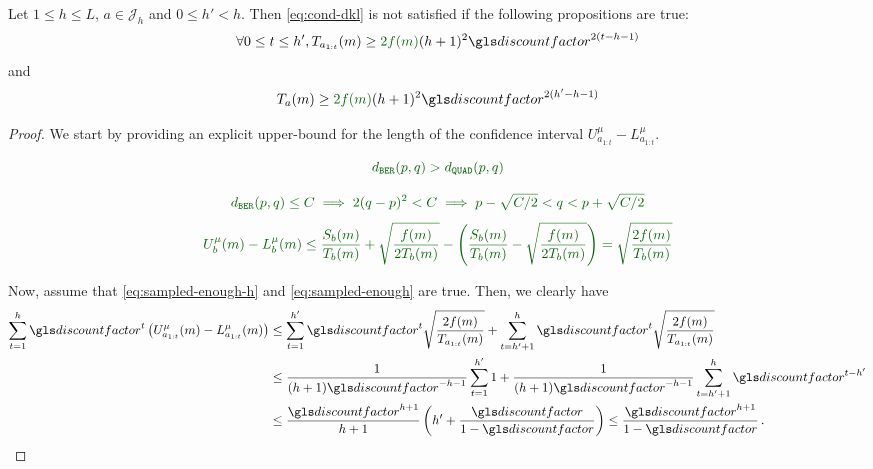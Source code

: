 \begin{lemma}
	\label{lemma:ci-length}
	\begin{leftbar}[lemmabar]
	Let $1 \leq h \leq L$, $a\in \mathcal{J}_h$ and $0 \leq h' < h$. Then  \eqref{eq:cond-dkl} is not satisfied if the following propositions are true:
	\begin{equation}
	\label{eq:sampled-enough-h}
	\forall 0\leq t\leq h', T_{a_{1:t}}(m) \geq \diff{2f(m)}(h+1)^2\discount^{2(t-h-1)}
	\end{equation}
	and
	\begin{equation}
	\label{eq:sampled-enough}
	T_{a}(m) \geq \diff{2f(m)}(h+1)^2\discount^{2(h'-h-1)}
	\end{equation}
	\end{leftbar}
\end{lemma}
\begin{proof}
	We start by providing an explicit upper-bound for the length of the confidence interval $U^{\mu}_{a_{1:t}} - L^{\mu}_{a_{1:t}}$. 
	
	\begin{equation*}
	\diff{\dber(p, q) > \dquad(p, q)}
	\end{equation*}
	
	\begin{equation*}
	\diff{\dber(p, q) \leq C   \implies 2(q - p)^2 < C  \implies p - \sqrt{C/2} < q < p + \sqrt{C/2}}
	\end{equation*}
	\begin{align*}
	\diff{U^{\mu}_{b}(m) - L^{\mu}_{b}(m) \leq \frac{S_b(m)}{T_b(m)} + \sqrt{\frac{f(m)}{2T_b(m)}} -  \left(\frac{S_b(m)}{T_b(m)} - \sqrt{\frac{f(m)}{2T_b(m)}}\right) 
		= \sqrt{\frac{2f(m)}{T_b(m)}}}
	\end{align*}
	
	Now, assume that \eqref{eq:sampled-enough-h} and \eqref{eq:sampled-enough} are true. Then, we clearly have
	\begin{align*}
	\sum_{t=1}^h \discount^t\left(U^{\mu}_{a_{1:t}}(m) - L^{\mu}_{a_{1:t}}(m)\right) &\leq \sum_{t=1}^{h'} \discount^t \sqrt{\frac{2f(m)}{T_{a_{1:t}}(m)}} + \sum_{t=h'+1}^h \discount^t \sqrt{\frac{2f(m)}{T_{a_{1:t}}(m)}} \\
	&\leq \frac{1}{(h+1)\discount^{-h-1}} \sum_{t=1}^{h'} 1 + \frac{1}{(h+1)\discount^{-h-1}} \sum_{t=h'+1}^h \discount^{t-h'}  \\
	&\leq \frac{\discount^{h+1}}{h+1} \left( h' + \frac{\discount}{1-\discount} \right)\leq \frac{\discount^{h+1}}{1-\discount}\,.
	\end{align*}
\end{proof}

